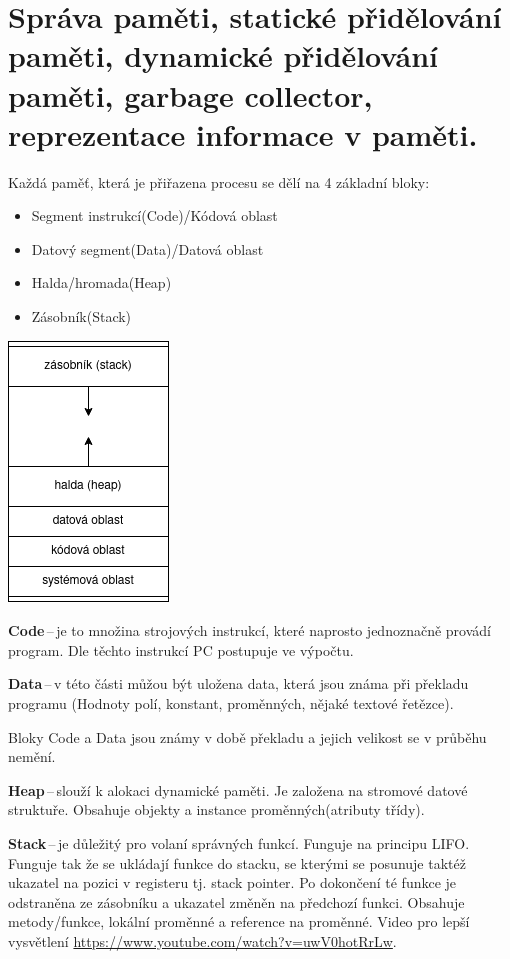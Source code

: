 \section{Správa paměti, statické přidělování paměti, dynamické přidělování paměti, garbage collector, reprezentace informace v paměti.}
Každá paměť, která je přiřazena procesu se dělí na 4 základní bloky:
\begin{multicols}{2}
\begin{itemize}
    \item Segment instrukcí(Code)/Kódová oblast
    \item Datový segment(Data)/Datová oblast
    \item Halda/hromada(Heap)
    \item Zásobník(Stack)
    \vfill
\end{itemize}
\includegraphics[scale=0.3]{images/pamet.png}
\end{multicols}
\textbf{Code}\,--\,je to množina strojových instrukcí, které naprosto jednoznačně provádí program. Dle těchto instrukcí PC postupuje ve výpočtu.

\textbf{Data}\,--\,v této části můžou být uložena data, která jsou známa při překladu programu (Hodnoty polí, konstant, proměnných, nějaké textové řetězce).

 Bloky Code a Data jsou známy v době překladu a jejich velikost se v průběhu nemění.

\textbf{Heap}\,--\,slouží k alokaci dynamické paměti. Je založena na stromové datové struktuře. Obsahuje objekty a instance proměnných(atributy třídy).

\textbf{Stack}\,--\,je důležitý pro volaní správných funkcí. Funguje na principu LIFO. Funguje tak že se ukládají funkce do stacku, se kterými se posunuje taktéž ukazatel na pozici v registeru tj. stack pointer. Po dokončení té funkce je odstraněna ze zásobníku a ukazatel změněn na předchozí funkci. Obsahuje metody/funkce, lokální proměnné a reference na proměnné. Video pro lepší vysvětlení \url{https://www.youtube.com/watch?v=uwV0hotRrLw}.\\

